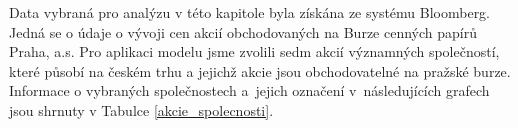 \documentclass[a4paper,12pt]{report}
\theoremstyle{definition} \newtheorem{definice}[veta]{Definice}
\theoremstyle{remark}
\begin{document}
Data vybraná pro analýzu v této kapitole byla získána ze systému Bloomberg.
Jedná se o údaje o vývoji cen akcií obchodovaných na Burze cenných papírů Praha, a.s.
Pro aplikaci modelu jsme zvolili sedm akcií významných společností, které působí na českém trhu a jejichž akcie jsou obchodovatelné na pražské burze.
Informace o vybraných společnostech a~jejich označení v~následujících grafech jsou shrnuty v Tabulce \ref{akcie_spolecnosti}.

\end{document}
